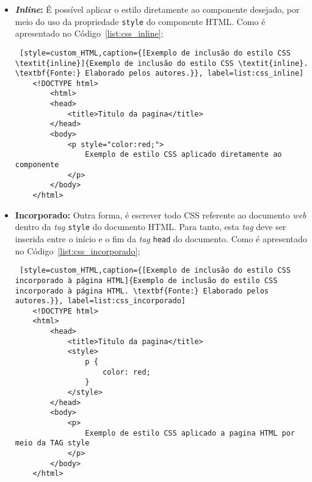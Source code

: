 \begin{itemize}
	\item \textbf{\textit{Inline}:} É possível aplicar o estilo diretamente ao componente desejado, por meio do uso da propriedade \texttt{style} do componente HTML. Como é apresentado no Código~\ref{list:css_inline};
	
	\begin{lstlisting} [style=custom_HTML,caption={[Exemplo de inclusão do estilo CSS \textit{inline}]{Exemplo de inclusão do estilo CSS \textit{inline}. \textbf{Fonte:} Elaborado pelos autores.}}, label=list:css_inline] 	
	<!DOCTYPE html>
		<html>
		<head>
			<title>Titulo da pagina</title>
		</head>
		<body>
			<p style="color:red;">
				Exemplo de estilo CSS aplicado diretamente ao componente
			</p>
		</body>
	</html>
	\end{lstlisting}
	
	
	\item \textbf{Incorporado:} Outra forma, é escrever todo CSS referente ao  documento \textit{web} dentro da \textit{tag} \texttt{style} do documento HTML. Para tanto, esta \textit{tag} deve ser inserida entre o início e o fim da \textit{tag} \texttt{head} do documento. Como é apresentado no Código~\ref{list:css_incorporado};
	
	\begin{lstlisting} [style=custom_HTML,caption={[Exemplo de inclusão do estilo CSS incorporado à página HTML]{Exemplo de inclusão do estilo CSS incorporado à página HTML. \textbf{Fonte:} Elaborado pelos autores.}}, label=list:css_incorporado] 	
	<!DOCTYPE html>
	<html>
		<head>
			<title>Titulo da pagina</title>
			<style>
				p {
					color: red;
				}
			</style>
		</head>
		<body>
			<p>
				Exemplo de estilo CSS aplicado a pagina HTML por meio da TAG style
			</p>
		</body>
	</html>
	\end{lstlisting}
	
	

\end{itemize}

